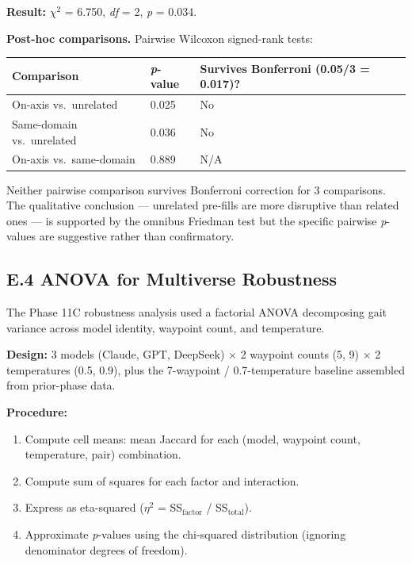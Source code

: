 \textbf{Result:} \(\chi^2\) = 6.750, \emph{df} = 2, \emph{p} = 0.034.

\textbf{Post-hoc comparisons.} Pairwise Wilcoxon signed-rank tests:

\begin{longtable}[]{@{}lll@{}}
\toprule\noalign{}
Comparison & \emph{p}-value & Survives Bonferroni (0.05/3 = 0.017)? \\
\midrule\noalign{}
\endhead
\bottomrule\noalign{}
\endlastfoot
On-axis vs.~unrelated & 0.025 & No \\
Same-domain vs.~unrelated & 0.036 & No \\
On-axis vs.~same-domain & 0.889 & N/A \\
\end{longtable}

Neither pairwise comparison survives Bonferroni correction for 3 comparisons. The qualitative conclusion --- unrelated pre-fills are more disruptive than related ones --- is supported by the omnibus Friedman test but the specific pairwise \emph{p}-values are suggestive rather than confirmatory.

\subsection{E.4 ANOVA for Multiverse Robustness}\label{e.4-anova-for-multiverse-robustness}

The Phase 11C robustness analysis used a factorial ANOVA decomposing gait variance across model identity, waypoint count, and temperature.

\textbf{Design:} 3 models (Claude, GPT, DeepSeek) \(\times\) 2 waypoint counts (5, 9) \(\times\) 2 temperatures (0.5, 0.9), plus the 7-waypoint / 0.7-temperature baseline assembled from prior-phase data.

\textbf{Procedure:}

\begin{enumerate}
\def\labelenumi{\arabic{enumi}.}
\tightlist
\item
  Compute cell means: mean Jaccard for each (model, waypoint count, temperature, pair) combination.
\item
  Compute sum of squares for each factor and interaction.
\item
  Express as eta-squared (\(\eta^2\) = SS\(_{\text{factor}}\) / SS\(_{\text{total}}\)).
\item
  Approximate \emph{p}-values using the chi-squared distribution (ignoring denominator degrees of freedom).
\end{enumerate}

